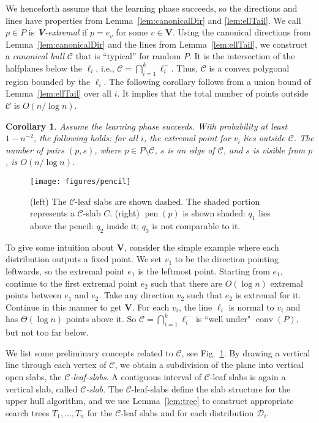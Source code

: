 \documentclass[letterpaper,11pt]{article}
\newtheorem{corol}[theorem]{Corollary}
\DeclareMathOperator{\UH}{conv}
\DeclareMathOperator{\pen}{pen}
\newcommand{\cC}{\mathcal{C}}
\newcommand{\cD}{\mathcal{D}}
\begin{document}
We henceforth assume that the learning 
phase succeeds, so the directions
and lines have properties from
Lemma~\ref{lem:canonicalDir} and \ref{lem:ellTail}.
We call $p \in P$ is \emph{\textup{\textbf{V}}-extremal} 
if $p = e_v$ for some $v \in \textbf{V}$.
Using the canonical directions 
from Lemma~\ref{lem:canonicalDir} and the
lines from Lemma~\ref{lem:ellTail}, we 
construct a \emph{canonical hull} $\cC$ 
that is ``typical'' for random $P$.
It is the intersection of the halfplanes 
below the $\ell_i$,
i.e., $\cC = \bigcap_{i=1}^{k} \ell_i^-$.
Thus, $\cC$ is a convex polygonal region 
bounded by the $\ell_i$. 
The following corollary follows from a union bound 
of Lemma~\ref{lem:ellTail} over all $i$. 
It implies that the total number
of points outside $\cC$ is $O(n/\log n)$.

\begin{corol}\label{cor:ellTail} 
  Assume the learning phase succeeds. 
  With probability at least $1 - n^{-2}$, 
  the following holds:  for all $i$, the 
  extremal point for $v_i$ lies outside $\cC$. 
  The number of pairs $(p, s)$, where 
  $p \in P \setminus \cC$, $s$ is an edge of $\cC$,
  and $s$ is visible from $p$, is $O(n/\log n)$.
\end{corol}


\begin{figure}
  \centering
  \texttt{[image: figures/pencil]} 
  \caption{(left) The $\cC$-leaf slabs
    are shown dashed. The shaded portion 
    represents a $\cC$-slab $C$. (right)
    $\pen(p)$ is shown shaded:
    $q_1$ 
    lies above the pencil: $q_2$ inside it; 
    $q_3$ is not comparable to it.}
\label{fig:pencil}
\end{figure}

To give some intuition about $\textbf{V}$, consider the simple example
where each distribution outputs a fixed point. We set $v_1$ to be the direction
pointing leftwards, so the extremal point $e_1$ is the leftmost point.
Starting from $e_1$, continue to the first extremal point $e_2$ such that
there are $O(\log n)$ extremal points between $e_1$ and $e_2$. Take any
direction $v_2$ such that $e_2$ is extremal for it. Continue in this manner
to get $\textbf{V}$. For each $v_i$, the line $\ell_i$ is normal to $v_i$ and has $\Theta(\log n)$ points
above it. So $\cC = \bigcap_{i=1}^{k} \ell_i^-$ is ``well under" $\UH(P)$, but not too far
below.


We list some preliminary concepts related to $\cC$,
see Fig.~\ref{fig:pencil}.
By drawing a vertical line through each 
vertex of $\cC$, we obtain a subdivision of 
the plane into vertical open slabs, the 
\emph{$\cC$-leaf-slabs}. A contiguous
interval of $\cC$-leaf slabs is again a 
vertical slab, called \emph{$\cC$-slab}.
The $\cC$-leaf-slabs define the slab 
structure for the upper hull algorithm, 
and we use Lemma~\ref{lem:tree} to construct 
appropriate search trees $T_1, \dots, T_n$ for 
the $\cC$-leaf slabs and for each   
distribution $\cD_i$.
\end{document}
